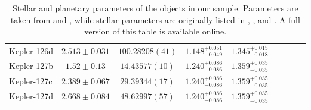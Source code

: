 \documentclass[a4paper,fleqn,usenatbib]{mnras}
\begin{document}
\begin{table*}
\begin{tabular}{lcccccccc}
Kepler-126d&	$2.513 \pm 0.031$	&$100.28208 (41)$	&$1.148_{-0.049}^{+0.051}$	&$1.345_{-0.018}^{+0.015}$	\\
Kepler-127b&	$1.52 \pm 0.13$    	&$14.43577 (10)$	&$1.240_{-0.086}^{+0.086}$	&$1.359_{-0.035}^{+0.035}$	\\
Kepler-127c&	$2.389 \pm 0.067$	&$29.39344 (17)$	&$1.240_{-0.086}^{+0.086}$	&$1.359_{-0.035}^{+0.035}$	\\
Kepler-127d&	$2.668 \pm 0.084$	&$48.62997 (57)$	&$1.240_{-0.086}^{+0.086}$	&$1.359_{-0.035}^{+0.035}$	\\
\end{tabular}
\caption{Stellar and planetary parameters of the objects in our sample. Parameters are taken from \protect\cite{vaneylen2015} and \protect\cite{vaneylen2017}, while stellar parameters are originally listed in \protect\cite{huber2013},  \protect\cite{silvaaguirre2015}, and \protect\cite{lundkvist2016}. A full version of this table is available online.\label{tab:parameters}}
\end{table*}
\end{document}
